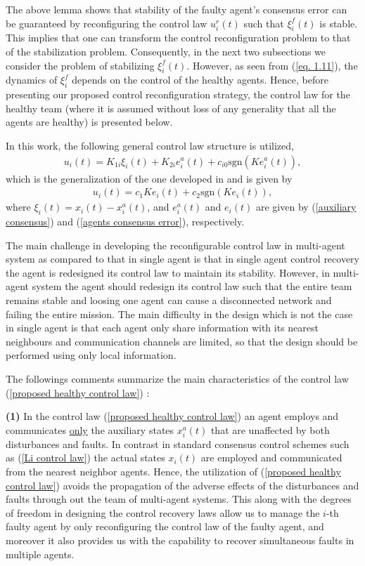 \documentclass[12pt,draftcls,onecolumn]{IEEEtran}
\begin{document}
The above lemma shows that stability of the faulty agent's consensus error can be guaranteed by  reconfiguring the control law $u_i^r(t)$ such that  $\xi_i^f(t)$ is stable. This implies that  one can transform the control reconfiguration problem to that of the stabilization problem. Consequently, in the next two subsections we consider the problem of stabilizing $\xi_i^f(t)$. However, as  seen from (\ref{eq. 1.11}), the dynamics of $\xi_i^f$ depends on the control of the healthy agents. Hence, before presenting our proposed control reconfiguration strategy, the control law for   the healthy team (where it is assumed without loss of any generality that all the agents are healthy) is presented below.
 \par
In this work, the following general  control law structure is utilized,
\begin{eqnarray}
u_i(t)=K_{1i}\xi_i(t)+K_{2i}e_i^a(t)+c_{i0}\text{sgn}(Ke_i^a(t)),\label{proposed healthy control law}
\end{eqnarray}
which is the generalization of the one  developed in \cite{Li13} and is given by 
\begin{eqnarray}
u_i(t)=c_1Ke_i(t)+c_2\text{sgn}(Ke_i(t)),\label{Li control law}
\end{eqnarray}
where $\xi_i(t)=x_i(t)-x_i^a(t)$, and  $e_i^a(t)$ and $e_i(t)$ are given by (\ref{auxiliary consensus}) and (\ref{agents consensus error}), respectively.

\begin{remarks}
The main challenge in developing the reconfigurable control law in multi-agent system as compared to that in single agent is that  in single agent control recovery the agent is redesigned its control law to maintain its stability. However, in multi-agent system the agent should redesign its control law such that the entire team remains stable and loosing one agent can cause a disconnected network and failing the entire mission. The main difficulty  in the design which is not the case in single agent is that   each agent only share information with its nearest neighbours and communication channels are limited, so that the design should be performed using only local information.  
\end{remarks}

The followings comments summarize the main characteristics of  the control law (\ref{proposed healthy control law}) : 

\textbf{(1)} In the control law (\ref{proposed healthy control law}) an agent employs and communicates \underline{only} the auxiliary states $x_i^a(t)$ that are   unaffected by  both disturbances and  faults. 
In contrast  in standard consensus control schemes such as  (\ref{Li control law})  the actual states $x_i(t)$ are employed and communicated from the nearest neighbor agents.  
 Hence, the utilization of  (\ref{proposed healthy control law})   avoids the propagation of the adverse effects of the disturbances and faults  through out the team of multi-agent systems. This along with the degrees of freedom in designing the control recovery laws  allow us to manage the $i$-th faulty agent by {only} reconfiguring the control law of the faulty agent, and moreover it also provides us with the capability to recover simultaneous faults in multiple agents. 
 
\end{document}
